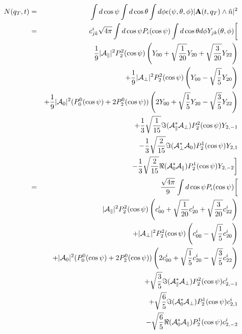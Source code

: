 \documentclass[a4paper,9pt,twoside]{article}
\begin{document}
\begin{eqnarray}
    N(q_T,t)  &=&  \int d\cos\psi\int d\cos\theta \int d\phi \epsilon(\psi,\theta,\phi) |{\bf A}(t,q_T) \wedge \hat{n}|^2 \\
      &=& c^i_{jk}\sqrt{4\pi} \int d\cos\psi   P_i(\cos\psi)  \int d\cos\theta d\phi Y_{jk}(\theta,\phi) 
          \biggl[  \\
          &&                   \frac{1}{9}|{\cal A}_\parallel|^2 P_2^2(\cos\psi) \left( Y_{00}+\sqrt{\frac{1}{20}}Y_{20}+\sqrt{\frac{3}{20}}Y_{22}  \right)  \\
          &&                  +\frac{1}{9}|{\cal A}_\perp|^2  P_2^2(\cos\psi) \left( Y_{00} - \sqrt{\frac{1}{5}}Y_{20}\right)\\
          &&                  +\frac{1}{9}|{\cal A}_0|^2  (P_0^0(\cos\psi)+2P_2^0(\cos\psi) ) \left( 2Y_{00}+\sqrt{\frac{1}{5}}Y_{20}-\sqrt{\frac{3}{5}}Y_{22} \right) \\
          &&                  +\frac{1}{3}\sqrt{\frac{1}{15}}\Im({\cal A}_\parallel^*{\cal A}_\perp)P_2^2(\cos\psi) Y_{2,-1}  \\
          &&                  -\frac{1}{3}\sqrt{ \frac{2}{15}} \Im({\cal A}_\perp^* {\cal A}_0 )P_2^1(\cos\psi)Y_{2,1} \\
          &&                  -\frac{1}{3}\sqrt{ \frac{2}{15}}\Re({\cal A}_0^*{\cal A}_\parallel  )P_2^1(\cos\psi) Y_{2,-2} 
          \biggr] \\
      &=& \frac{\sqrt{4\pi}}{9}  \int d\cos\psi   P_i(\cos\psi) \biggl[  \\
          &&                   |{\cal A}_\parallel|^2 P_2^2(\cos\psi)              \left( c^i_{00}  +\sqrt{\frac{1}{20}}c^i_{20}+\sqrt{\frac{3}{20}}c^i_{22}  \right)  \\
          &&                  +|{\cal A}_\perp|^2  P_2^2(\cos\psi)                 \left( c^i_{00}  -\sqrt{\frac{1}{ 5}}c^i_{20}\right)\\
          &&                  +|{\cal A}_0|^2  (P_0^0(\cos\psi)+2P_2^0(\cos\psi) ) \left( 2 c^i_{00}+\sqrt{\frac{1}{ 5}}c^i_{20}-\sqrt{\frac{3}{ 5}}c^i_{22} \right) \\
          &&                  +\sqrt{\frac{3}{5}}\Im({\cal A}_\parallel^*{\cal A}_\perp)P_2^2(\cos\psi) c^i_{2,-1}  \\
          &&                  +\sqrt{\frac{6}{5}} \Im({\cal A}_0^* {\cal A}_\perp )P_2^1(\cos\psi)c^i_{2,1} \\
          &&                  -\sqrt{\frac{6}{5}}\Re({\cal A}_0^*{\cal A}_\parallel  )P_2^1(\cos\psi) c^i_{2,-2} 

\end{eqnarray}
\end{document}
